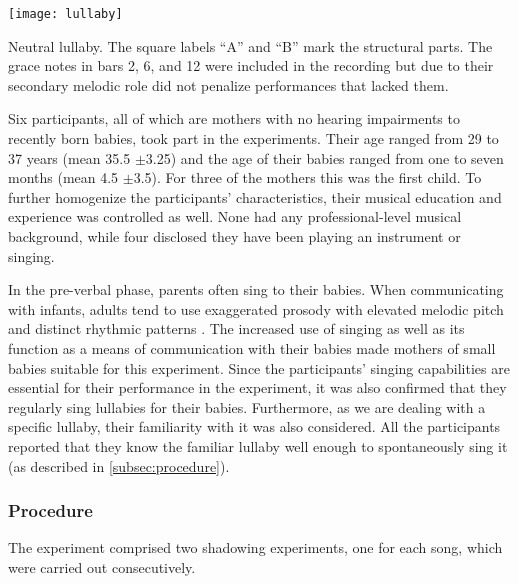 \begin{snippet}[t]
	\centering
	\texttt{[image: lullaby]}
	\caption{Neutral lullaby.
			 The square labels \enquote{A} and \enquote{B} mark the structural parts.
		 	 The grace notes in bars 2, 6, and 12 were included in the recording but due to their secondary melodic role did not penalize performances that lacked them.}
	\label{snippet:uni-lullaby}
\end{snippet}

Six participants, all of which are mothers with no hearing impairments to recently born babies, took part in the experiments.
Their age ranged from 29 to 37 years (mean 35.5 $\pm$3.25) and the age of their babies ranged from one to seven months (mean 4.5 $\pm$3.5).
For three of the mothers this was the first child.
To further homogenize the participants' characteristics, their musical education and experience was controlled as well.
None had any professional-level musical background, while four disclosed they have been playing an instrument or singing.

In the pre-verbal phase, parents often sing to their babies.
When communicating with infants, adults tend to use exaggerated prosody with elevated melodic pitch and distinct rhythmic patterns \citep{Fernald1991prosody}.
The increased use of singing as well as its function as a means of communication with their babies \citep[see][]{Street2003mothers,Papouvsek1991meanings} made mothers of small babies suitable for this experiment.
Since the participants' singing capabilities are essential for their performance in the experiment, it was also confirmed that they regularly sing lullabies for their babies.
Furthermore, as we are dealing with a specific lullaby, their familiarity with it was also considered.
All the participants reported that they know the familiar lullaby well enough to spontaneously sing it (as described in \cref{subsec:procedure}).

\subsubsection{Procedure}
\label{subsubsec:procedure_music}


The experiment comprised two shadowing experiments, one for each song, which were carried out consecutively.

